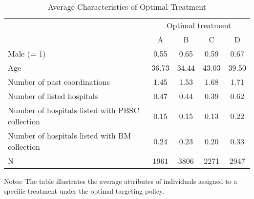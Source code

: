 \documentclass[12pt, a4paper]{article}
\begin{document}
\begin{table}

\caption{\label{tab:targeting-character}Average Characteristics of Optimal Treatment}
\centering
\fontsize{9}{11}\selectfont
\begin{threeparttable}
\begin{tabular}[t]{lcccc}
\toprule
\multicolumn{1}{c}{ } & \multicolumn{4}{c}{Optimal treatment} \\
\cmidrule(l{3pt}r{3pt}){2-5}
 & A & B & C & D\\
\midrule
Male (= 1) & 0.55 & 0.65 & 0.59 & 0.67\\
Age & 36.73 & 34.44 & 43.03 & 39.50\\
Number of past coordinations & 1.45 & 1.53 & 1.68 & 1.71\\
Number of listed hospitals & 0.47 & 0.44 & 0.39 & 0.62\\
Number of hospitals listed with PBSC collection & 0.15 & 0.15 & 0.13 & 0.22\\
Number of hospitals listed with BM collection & 0.24 & 0.23 & 0.20 & 0.33\\
N & 1961 & 3806 & 2271 & 2947\\
\bottomrule
\end{tabular}
\begin{tablenotes}
\item Notes: The table illustrates the average attributes of individuals assigned to a specific treatment under the optimal targeting policy.
\end{tablenotes}
\end{threeparttable}
\end{table}
\end{document}
